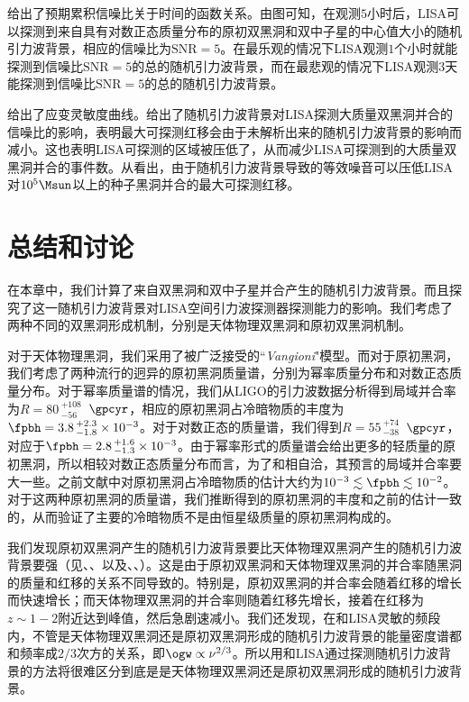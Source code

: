 给出了预期累积信噪比关于时间的函数关系。由图可知，在观测$5$小时后，LISA可以探测到来自具有对数正态质量分布的原初双黑洞和双中子星的中心值大小的随机引力波背景，相应的信噪比为$\mathrm{SNR} = 5$。在最乐观的情况下LISA观测$1$个小时就能探测到信噪比$\mathrm{SNR} = 5$的总的随机引力波背景，而在最悲观的情况下LISA观测$3$天能探测到信噪比$\mathrm{SNR} = 5$的总的随机引力波背景。

给出了应变灵敏度曲线。给出了随机引力波背景对LISA探测大质量双黑洞并合的信噪比的影响，表明最大可探测红移会由于未解析出来的随机引力波背景的影响而减小。这也表明LISA可探测的区域被压低了，从而减少LISA可探测到的大质量双黑洞并合的事件数。从看出，由于随机引力波背景导致的等效噪音可以压低LISA对$10^5 \Msun$以上的种子黑洞并合的最大可探测红移。



\section{总结和讨论}

在本章中，我们计算了来自双黑洞和双中子星并合产生的随机引力波背景。而且探究了这一随机引力波背景对LISA空间引力波探测器探测能力的影响。我们考虑了两种不同的双黑洞形成机制，分别是天体物理双黑洞和原初双黑洞机制。

对于天体物理黑洞，我们采用了被广泛接受的``\textit{Vangioni}"模型\citep{Dvorkin:2016wac}。而对于原初黑洞，我们考虑了两种流行的迥异的原初黑洞质量谱，分别为幂率质量分布和对数正态质量分布。对于幂率质量谱的情况，我们从LIGO的引力波数据分析得到局域并合率为$R = 80\,^{+108}_{-56}$\, $\gpcyr$，相应的原初黑洞占冷暗物质的丰度为$\fpbh = 3.8\,^{+2.3}_{-1.8} \times 10^{-3}$。对于对数正态的质量谱，我们得到$R = 55\,^{+74}_{-38}$\, $\gpcyr$，对应于$\fpbh = 2.8\,^{+1.6}_{-1.3} \times 10^{-3}$。由于幂率形式的质量谱会给出更多的轻质量的原初黑洞，所以相较对数正态质量分布而言，为了和\lvc 相自洽，其预言的局域并合率要大一些。之前文献\citep{Kawasaki:2016jop,Ali-Haimoud:2017rtz,Raidal:2017mfl,Kocsis:2017yty,Chen:2018czv}中对原初黑洞占冷暗物质的估计大约为$10^{-3} \lesssim \fpbh \lesssim 10^{-2}$。对于这两种原初黑洞的质量谱，我们推断得到的原初黑洞的丰度和之前的估计一致的，从而验证了主要的冷暗物质不是由恒星级质量的原初黑洞构成的。

我们发现原初双黑洞产生的随机引力波背景要比天体物理双黑洞产生的随机引力波背景要强（见、、以及、、）。这是由于原初双黑洞和天体物理双黑洞的并合率随黑洞的质量和红移的关系不同导致的。特别是，原初双黑洞的并合率会随着红移的增长而快速增长；而天体物理双黑洞的并合率则随着红移先增长，接着在红移为$z \sim 1-2$附近达到峰值，然后急剧速减小。我们还发现，在\lvc 和LISA灵敏的频段内，不管是天体物理双黑洞还是原初双黑洞形成的随机引力波背景的能量密度谱都和频率成$2/3$次方的关系，即$\ogw \propto \nu^{2/3}$。所以用\lvc 和LISA通过探测随机引力波背景的方法将很难区分到底是是天体物理双黑洞还是原初双黑洞形成的随机引力波背景。

